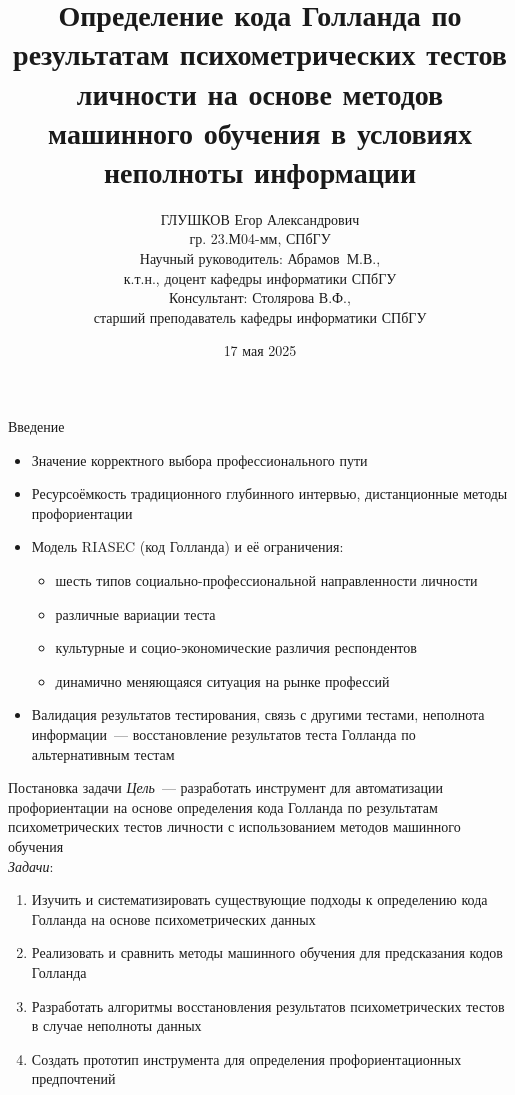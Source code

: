 \documentclass[english,russian, 10pt]{beamer}
\title{Определение кода Голланда по результатам психометрических тестов личности на основе методов машинного обучения в условиях неполноты информации\\[0.5cm]}
\author{ГЛУШКОВ Егор Александрович\\[0.2cm]гр. 23.М04-мм, СПбГУ\\[0.2cm]
Научный руководитель: Абрамов~М.В.,\\[0.02cm]к.т.н., доцент кафедры информатики СПбГУ\\[0.2cm]
Консультант: Столярова В.Ф.,\\[0.02cm]старший преподаватель кафедры информатики СПбГУ}
\date{17 мая 2025}
\begin{document}
\begin{frame}[plain]
    \titlepage
\end{frame}


\begin{frame}{Введение}
    \begin{itemize}
        \item Значение корректного выбора профессионального пути
        \item Ресурсоёмкость традиционного глубинного интервью, дистанционные методы профориентации
        \item Модель RIASEC (код Голланда) и её ограничения: 
            \begin{itemize}
                \item шесть типов социально-профессиональной направленности личности
                \item различные вариации теста
                \item культурные и социо-экономические различия респондентов
                \item динамично меняющаяся ситуация на рынке профессий
            \end{itemize}
        \item Валидация результатов тестирования, связь с другими тестами, неполнота информации~--- восстановление результатов теста Голланда по альтернативным тестам
    \end{itemize}
\end{frame}


\begin{frame}{Постановка задачи}
    \emph{Цель}~--- разработать инструмент для автоматизации профориентации на основе определения кода Голланда по результатам психометрических тестов личности с использованием методов машинного обучения\\[0.3cm]
    \emph{Задачи}:
    \begin{enumerate}
        \item Изучить и систематизировать существующие подходы к определению кода Голланда на основе психометрических данных
        \item Реализовать и сравнить методы машинного обучения для предсказания кодов Голланда
        \item Разработать алгоритмы восстановления результатов психометрических тестов в случае неполноты данных
        \item Создать прототип инструмента для определения профориентационных предпочтений
    \end{enumerate}
\end{frame}
\end{document}

